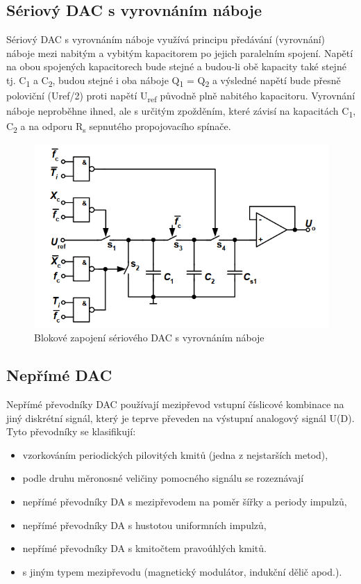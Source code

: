 \subsection{Sériový DAC s vyrovnáním náboje}
Sériový DAC s vyrovnáním náboje využívá principu předávání (vyrovnání) náboje mezi nabitým a vybitým kapacitorem po jejich paralelním spojení. Napětí na obou spojených kapacitorech bude stejné a budou-li obě kapacity také stejné tj. C\textsubscript{1} a C\textsubscript{2}, budou stejné i oba náboje Q\textsubscript{1} = Q\textsubscript{2} a výsledné napětí bude přesně poloviční (Uref/2) proti napětí U\textsubscript{ref} původně plně nabitého kapacitoru. Vyrovnání náboje neproběhne ihned, ale s určitým zpožděním, které závisí na kapacitách C\textsubscript{1}, C\textsubscript{2} a na odporu R\textsubscript{s} sepnutého propojovacího spínače.
\begin{figure}[h]
   \begin{center}
     \includegraphics[scale=0.6]{images/DAvyrov.png}
   \end{center}
   \caption{Blokové zapojení sériového DAC s vyrovnáním náboje}
\end{figure}



\subsection{Nepřímé DAC}
Nepřímé převodníky DAC používají mezipřevod vstupní číslicové kombinace na jiný diskrétní signál, který je teprve převeden na výstupní analogový signál U(D). Tyto převodníky se klasifikují:
\begin{itemize}
\item vzorkováním periodických pilovitých kmitů (jedna z nejstarších metod),
\item podle druhu měronosné veličiny pomocného signálu se rozeznávají
\item nepřímé převodníky DA s mezipřevodem na poměr šířky a periody impulzů,
\item nepřímé převodníky DA s hustotou uniformních impulzů,
\item nepřímé převodníky DA s kmitočtem pravoúhlých kmitů.
\item s jiným typem mezipřevodu (magnetický modulátor, indukční dělič apod.).
\end{itemize}

